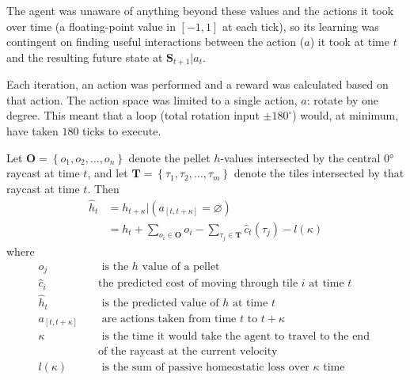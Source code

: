 The agent was unaware of anything beyond these values and the actions it took over time (a floating-point value in \([-1,1]\) at each tick), so its learning was contingent on finding useful interactions between the action (\(a\)) it took at time \(t\) and the resulting future state at \(\mathbf{S}_{t+1}|a_t\).

Each iteration, an action was performed and a reward was calculated based on that action. The action space was limited to a single action, \(a\): rotate by one degree. This meant that a loop (total rotation input \(\pm 180^\circ\)) would, at minimum, have taken \(180\) ticks to execute.

Let \(\mathbf{O} = \left\{ o_1,o_2,\ldots,o_{n} \right\}\) denote the pellet \(h\)-values intersected by the central 0° raycast at time \(t\), and let \(\mathbf{T} = \left\{\tau_1,\tau_2,\ldots,\tau_{m}\right\}\) denote the tiles intersected by that raycast at time \(t\). Then
\begin{equation}
    \begin{aligned}
        \hat{h}_t & = h_{t+\kappa}|(a_{[t, t+\kappa]}= \varnothing)                                                        \\
                  & = h_t + \sum_{o_i \in \mathbf{O}} o_{i} - \sum_{\tau_j \in \mathbf{T}} \hat{c}_{t}(\tau_j) - l(\kappa)
    \end{aligned}
\end{equation}
where
\begin{align*}
    o_{j}             & \quad\text{ is the }h \text{ value of a pellet}                               \\
    \hat{c}_{i}       & \quad\text{the predicted cost of moving through tile }i\text{ at time }t      \\
    \hat{h}_t         & \quad\text{ is the predicted value of } h\text{ at time } t                   \\
    a_{[t, t+\kappa]} & \quad\text{ are actions taken from time } t\text{ to } t+\kappa               \\
    \kappa            & \quad\text{ is the time it would take the agent to travel to the end }        \\
                      & \quad\text{of the raycast at the current velocity}                            \\
    l(\kappa)         & \quad\text{ is the sum of passive homeostatic loss over } \kappa \text{ time} \\
\end{align*}

